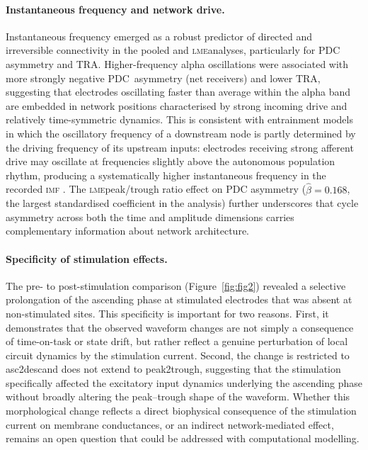 \documentclass[11pt, a4paper]{article}
\newcommand{\imf}{\textsc{imf}}
\newcommand{\lme}{\textsc{lme}}
\newcommand{\asc}{asc2desc}
\newcommand{\ptr}{peak2trough}
\begin{document}
\paragraph{Instantaneous frequency and network drive.}
Instantaneous frequency emerged as a robust predictor of directed and
irreversible connectivity in the pooled and \lme analyses, particularly for
PDC asymmetry and TRA. Higher-frequency alpha oscillations were associated
with more strongly negative PDC~asymmetry (net receivers) and lower TRA,
suggesting that electrodes oscillating faster than average within the alpha
band are embedded in network positions characterised by strong incoming
drive and relatively time-symmetric dynamics. This is consistent with
entrainment models in which the oscillatory frequency of a downstream node
is partly determined by the driving frequency of its upstream inputs:
electrodes receiving strong afferent drive may oscillate at frequencies
slightly above the autonomous population rhythm, producing a
systematically higher instantaneous frequency in the recorded \imf
\citep{fries2015rhythms, jensen2007human}. The \lme peak/trough ratio
effect on PDC asymmetry ($\hat{\beta} = 0.168$, the largest standardised
coefficient in the analysis) further underscores that cycle asymmetry
across both the time and amplitude dimensions carries complementary
information about network architecture.

\paragraph{Specificity of stimulation effects.}
The pre- to post-stimulation comparison (Figure~\ref{fig:fig2}) revealed a
selective prolongation of the ascending phase at stimulated electrodes that
was absent at non-stimulated sites. This specificity is important for two
reasons. First, it demonstrates that the observed waveform changes are not
simply a consequence of time-on-task or state drift, but rather reflect a
genuine perturbation of local circuit dynamics by the stimulation current.
Second, the change is restricted to \asc and does not extend to \ptr,
suggesting that the stimulation specifically affected the excitatory input
dynamics underlying the ascending phase without broadly altering the
peak--trough shape of the waveform. Whether this morphological change
reflects a direct biophysical consequence of the stimulation current on
membrane conductances, or an indirect network-mediated effect, remains an
open question that could be addressed with computational modelling.
\end{document}
